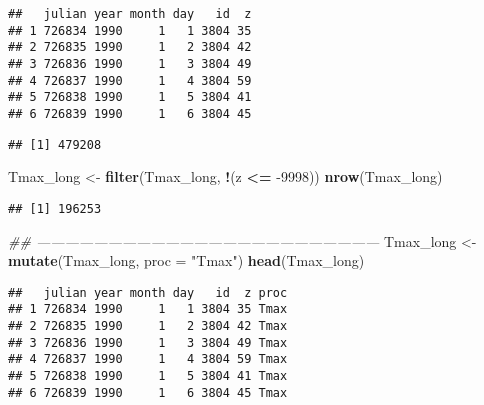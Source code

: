 \documentclass[]{book}
\newenvironment{Shaded}{\begin{snugshade}}{\end{snugshade}}
\newcommand{\CommentTok}[1]{\textcolor[rgb]{0.56,0.35,0.01}{\textit{#1}}}
\newcommand{\DataTypeTok}[1]{\textcolor[rgb]{0.13,0.29,0.53}{#1}}
\newcommand{\DecValTok}[1]{\textcolor[rgb]{0.00,0.00,0.81}{#1}}
\newcommand{\KeywordTok}[1]{\textcolor[rgb]{0.13,0.29,0.53}{\textbf{#1}}}
\newcommand{\NormalTok}[1]{#1}
\newcommand{\OperatorTok}[1]{\textcolor[rgb]{0.81,0.36,0.00}{\textbf{#1}}}
\newcommand{\StringTok}[1]{\textcolor[rgb]{0.31,0.60,0.02}{#1}}
\begin{document}
\begin{verbatim}
##   julian year month day   id  z
## 1 726834 1990     1   1 3804 35
## 2 726835 1990     1   2 3804 42
## 3 726836 1990     1   3 3804 49
## 4 726837 1990     1   4 3804 59
## 5 726838 1990     1   5 3804 41
## 6 726839 1990     1   6 3804 45
\end{verbatim}

\begin{Shaded}
\end{Shaded}

\begin{verbatim}
## [1] 479208
\end{verbatim}

\begin{Shaded}
\begin{Highlighting}[]
\NormalTok{Tmax_long <-}\StringTok{ }\KeywordTok{filter}\NormalTok{(Tmax_long, }\OperatorTok{!}\NormalTok{(z }\OperatorTok{<=}\StringTok{ }\DecValTok{-9998}\NormalTok{))}
\KeywordTok{nrow}\NormalTok{(Tmax_long)}
\end{Highlighting}
\end{Shaded}

\begin{verbatim}
## [1] 196253
\end{verbatim}

\begin{Shaded}
\begin{Highlighting}[]
\CommentTok{## ------------------------------------------------------------------------}
\NormalTok{Tmax_long <-}\StringTok{ }\KeywordTok{mutate}\NormalTok{(Tmax_long, }\DataTypeTok{proc =} \StringTok{"Tmax"}\NormalTok{)}
\KeywordTok{head}\NormalTok{(Tmax_long)}
\end{Highlighting}
\end{Shaded}

\begin{verbatim}
##   julian year month day   id  z proc
## 1 726834 1990     1   1 3804 35 Tmax
## 2 726835 1990     1   2 3804 42 Tmax
## 3 726836 1990     1   3 3804 49 Tmax
## 4 726837 1990     1   4 3804 59 Tmax
## 5 726838 1990     1   5 3804 41 Tmax
## 6 726839 1990     1   6 3804 45 Tmax
\end{verbatim}
\end{document}
